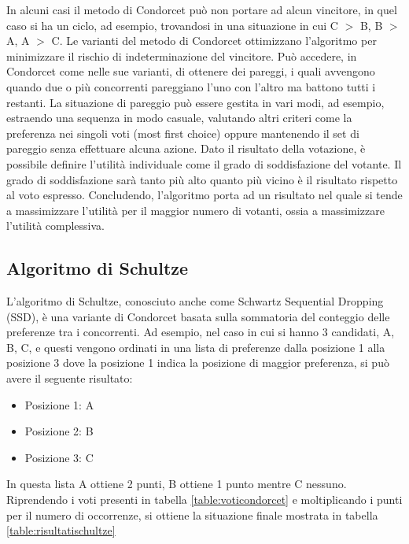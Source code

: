 \documentclass[12pt,a4paper,openright,twoside]{book}
\begin{document}
In alcuni casi il metodo di Condorcet può non portare ad alcun vincitore, in quel caso si
ha un ciclo, ad esempio, trovandosi in una situazione 
in cui C $>$ B, B $>$ A, A $>$ C.
Le varianti del metodo di Condorcet ottimizzano l'algoritmo per minimizzare il rischio
di indeterminazione del vincitore.
Può accedere, in Condorcet come nelle sue varianti, di ottenere dei pareggi,
i quali avvengono quando due o più concorrenti pareggiano l'uno con l'altro ma 
battono tutti i restanti. La situazione di pareggio può essere gestita in vari
modi, ad esempio, estraendo una sequenza in modo casuale, valutando altri criteri
come la preferenza nei singoli voti (most first choice) oppure mantenendo il set di pareggio
senza effettuare alcuna azione.
Dato il risultato della votazione, è possibile definire l'utilità individuale come il grado
di soddisfazione del votante. Il grado di soddisfazione sarà tanto più alto 
quanto più vicino è il risultato rispetto al voto espresso.
Concludendo, l'algoritmo porta ad un risultato nel quale si tende a massimizzare
l'utilità per il maggior numero di votanti, ossia a massimizzare l'utilità
complessiva. 

\subsection{Algoritmo di Schultze}
L'algoritmo di Schultze, conosciuto anche come Schwartz Sequential Dropping (SSD),
è una variante di Condorcet basata sulla sommatoria del conteggio delle preferenze tra i concorrenti.
Ad esempio, nel caso in cui si hanno 3 candidati, A, B, C,
e questi vengono ordinati in una lista di preferenze dalla posizione 1 alla posizione 3 dove la posizione 1 
indica la posizione di maggior preferenza, si può avere il seguente risultato:
\begin{itemize}
    \item{Posizione 1: A}
    \item{Posizione 2: B}
    \item{Posizione 3: C}
\end{itemize}    
In questa lista A ottiene 2 punti, B ottiene 1 punto mentre C nessuno.
Riprendendo i voti presenti in tabella \ref{table:voticondorcet} e moltiplicando
i punti per il numero di occorrenze, si ottiene la situazione finale mostrata in tabella \ref{table:risultatischultze}
\end{document}
